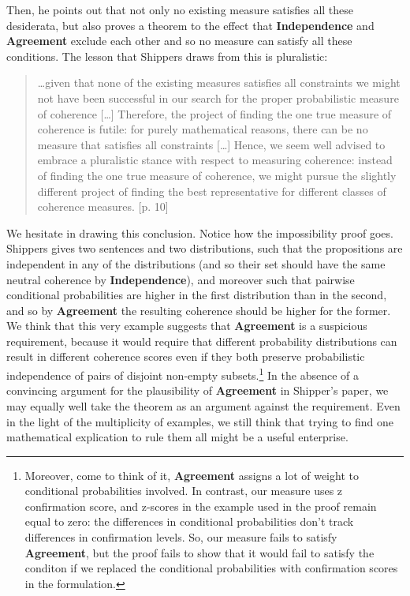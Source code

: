 \documentclass[10pt,]{scrartcl}
\begin{document}
\vspace{2mm}

Then, he points out that not only no existing measure satisfies all
these desiderata, but also proves a theorem to the effect that
\textbf{Independence} and \textbf{Agreement} exclude each other and so
no measure can satisfy all these conditions. The lesson that Shippers
draws from this is pluralistic:

\begin{quote}
\dots given that none of the
existing measures satisfies all constraints we might not have been successful in our search for the proper probabilistic measure of coherence [\dots] Therefore, the project of finding the one true measure of coherence is futile: for
purely mathematical reasons, there can be no measure that satisfies all constraints
[\dots] Hence, we seem well advised to embrace a pluralistic stance with
respect to measuring coherence: instead of finding the one true measure of coherence, we might pursue the slightly different project of finding the best representative for different classes of coherence measures.  [p. 10]
\end{quote}

We hesitate in drawing this conclusion. Notice how the impossibility
proof goes. Shippers gives two sentences and two distributions, such
that the propositions are independent in any of the distributions (and
so their set should have the same neutral coherence by
\textbf{Independence}), and moreover such that pairwise conditional
probabilities are higher in the first distribution than in the second,
and so by \textbf{Agreement} the resulting coherence should be higher
for the former. We think that this very example suggests that
\textbf{Agreement} is a suspicious requirement, because it would require
that different probability distributions can result in different
coherence scores even if they both preserve probabilistic independence
of pairs of disjoint non-empty
subsets.\footnote{Moreover, come to think of it, \textbf{Agreement} assigns a lot of weight to conditional probabilities involved. In contrast, our measure uses  z confirmation score, and z-scores in the example used in the proof remain equal to zero: the differences in conditional probabilities don't track differences in confirmation levels. So, our measure fails to satisfy \textbf{Agreement}, but the proof fails to show that it would fail to satisfy the conditon if we replaced the conditional probabilities with confirmation scores in the formulation.}
In the absence of a convincing argument for the plausibility of
\textbf{Agreement} in Shipper's paper, we may equally well take the
theorem as an argument against the requirement. Even in the light of the
multiplicity of examples, we still think that trying to find one
mathematical explication to rule them all might be a useful enterprise.
\end{document}
